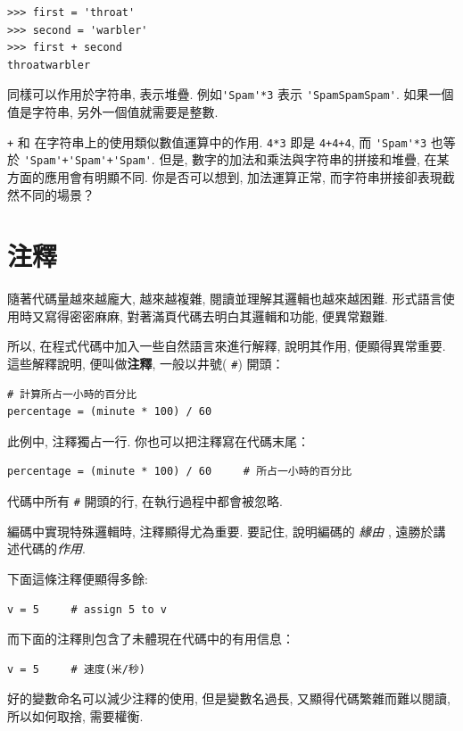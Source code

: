 \documentclass[10pt]{book}
\begin{document}
\begin{verbatim}
>>> first = 'throat'
>>> second = 'warbler'
>>> first + second
throatwarbler
\end{verbatim}
%
 {\tt *} 同樣可以作用於字符串, 表示堆疊. 例如\verb"'Spam'*3" 表示
\verb"'SpamSpamSpam'". 如果一個值是字符串, 另外一個值就需要是整數. 

{\tt +} 和 {\tt *}在字符串上的使用類似數值運算中的作用. 
 {\tt 4*3} 即是 {\tt 4+4+4}, 
而 \verb"'Spam'*3"  也等於 \verb"'Spam'+'Spam'+'Spam'". 
但是, 數字的加法和乘法與字符串的拼接和堆疊, 在某方面的應用會有明顯不同. 
你是否可以想到, 加法運算正常, 而字符串拼接卻表現截然不同的場景？



\section{注釋}

隨著代碼量越來越龐大, 越來越複雜, 閱讀並理解其邏輯也越來越困難. 
形式語言使用時又寫得密密麻麻, 對著滿頁代碼去明白其邏輯和功能, 便異常艱難. 

所以, 在程式代碼中加入一些自然語言來進行解釋, 說明其作用, 便顯得異常重要. 
這些解釋說明, 便叫做{\bf 注釋},  一般以井號( \verb"#") 開頭：

\begin{verbatim}
# 計算所占一小時的百分比
percentage = (minute * 100) / 60
\end{verbatim}
%
此例中, 注釋獨占一行. 你也可以把注釋寫在代碼末尾：

\begin{verbatim}
percentage = (minute * 100) / 60     # 所占一小時的百分比
\end{verbatim}
%
代碼中所有  {\tt \#} 開頭的行, 在執行過程中都會被忽略. 

編碼中實現特殊邏輯時, 注釋顯得尤為重要. 
要記住, 說明編碼的 {\em 緣由} , 遠勝於講述代碼的{\em 作用}. 

下面這條注釋便顯得多餘:

\begin{verbatim}
v = 5     # assign 5 to v
\end{verbatim}
%

而下面的注釋則包含了未體現在代碼中的有用信息：

\begin{verbatim}
v = 5     # 速度(米/秒) 
\end{verbatim}
%
好的變數命名可以減少注釋的使用, 但是變數名過長, 又顯得代碼繁雜而難以閱讀, 
所以如何取捨, 需要權衡. 
\end{document}
